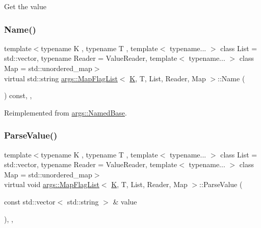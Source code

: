 Get the value \mbox{\label{classargs_1_1_map_flag_list_a1703584ba7b36c5e15aa375eae23903c}} 
\subsubsection{\texorpdfstring{Name()}{Name()}}
{\footnotesize\ttfamily template$<$typename K , typename T , template$<$ typename... $>$ class List = std\+::vector, typename Reader  = Value\+Reader, template$<$ typename... $>$ class Map = std\+::unordered\+\_\+map$>$ \\
virtual std\+::string \hyperlink{classargs_1_1_map_flag_list}{args\+::\+Map\+Flag\+List}$<$ \hyperlink{cgal__test_8cpp_a891e241aa245ae63618f03737efba309}{K}, T, List, Reader, Map $>$\+::Name (\begin{DoxyParamCaption}{ }\end{DoxyParamCaption}) const\hspace{0.3cm}{\ttfamily [inline]}, {\ttfamily [override]}, {\ttfamily [virtual]}}



Reimplemented from \hyperlink{classargs_1_1_named_base_a7e7bab5c0de59e717b87935b14376dfc}{args\+::\+Named\+Base}.

\mbox{\label{classargs_1_1_map_flag_list_af37b4d7e420eabf62bd8dacafa86419c}} 
\subsubsection{\texorpdfstring{Parse\+Value()}{ParseValue()}}
{\footnotesize\ttfamily template$<$typename K , typename T , template$<$ typename... $>$ class List = std\+::vector, typename Reader  = Value\+Reader, template$<$ typename... $>$ class Map = std\+::unordered\+\_\+map$>$ \\
virtual void \hyperlink{classargs_1_1_map_flag_list}{args\+::\+Map\+Flag\+List}$<$ \hyperlink{cgal__test_8cpp_a891e241aa245ae63618f03737efba309}{K}, T, List, Reader, Map $>$\+::Parse\+Value (\begin{DoxyParamCaption}\item[{const std\+::vector$<$ std\+::string $>$ \&}]{value }\end{DoxyParamCaption})\hspace{0.3cm}{\ttfamily [inline]}, {\ttfamily [override]}, {\ttfamily [virtual]}}

